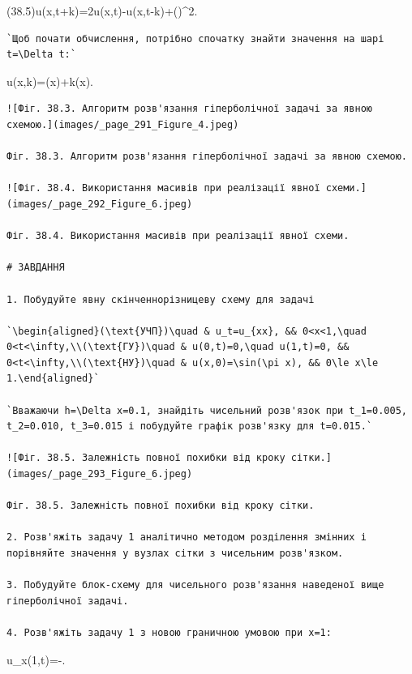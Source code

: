 \documentclass[
  ukrainian,
]{article}
\begin{document}
(38.5)\qquad u(x,t+k)=2u(x,t)-u(x,t-k)+\left(\right)\^{}2\left[u(x+h,t)-2u(x,t)+u(x-h,t)\right].

\begin{verbatim}
`Щоб почати обчислення, потрібно спочатку знайти значення на шарі t=\Delta t:`
\end{verbatim}

u(x,k)=\varphi(x)+k\psi(x).

\begin{verbatim}
![Фіг. 38.3. Алгоритм розв'язання гіперболічної задачі за явною схемою.](images/_page_291_Figure_4.jpeg)

Фіг. 38.3. Алгоритм розв'язання гіперболічної задачі за явною схемою.

![Фіг. 38.4. Використання масивів при реалізації явної схеми.](images/_page_292_Figure_6.jpeg)

Фіг. 38.4. Використання масивів при реалізації явної схеми.

# ЗАВДАННЯ

1. Побудуйте явну скінченнорізницеву схему для задачі

`\begin{aligned}(\text{УЧП})\quad & u_t=u_{xx}, && 0<x<1,\quad 0<t<\infty,\\(\text{ГУ})\quad & u(0,t)=0,\quad u(1,t)=0, && 0<t<\infty,\\(\text{НУ})\quad & u(x,0)=\sin(\pi x), && 0\le x\le 1.\end{aligned}`

`Вважаючи h=\Delta x=0.1, знайдіть чисельний розв'язок при t_1=0.005, t_2=0.010, t_3=0.015 і побудуйте графік розв'язку для t=0.015.`

![Фіг. 38.5. Залежність повної похибки від кроку сітки.](images/_page_293_Figure_6.jpeg)

Фіг. 38.5. Залежність повної похибки від кроку сітки.

2. Розв'яжіть задачу 1 аналітично методом розділення змінних і порівняйте значення у вузлах сітки з чисельним розв'язком.

3. Побудуйте блок-схему для чисельного розв'язання наведеної вище гіперболічної задачі.

4. Розв'яжіть задачу 1 з новою граничною умовою при x=1:
\end{verbatim}

u\_x(1,t)=-\left[u(1,t)-1\right].
\end{document}
